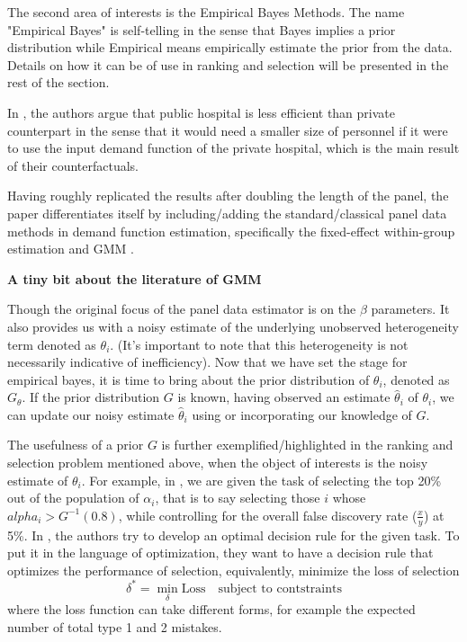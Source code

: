 \documentclass[12pt]{article}
\begin{document}
The second area of interests is the Empirical Bayes Methods. The name
"Empirical Bayes" is self-telling in the sense that Bayes implies a prior
distribution while Empirical means empirically estimate the prior from the
data. Details on how it can be of use in ranking and selection will be
presented in the rest of the section.

In \cite{croiset2024hospitals}, the authors argue that public hospital is less
efficient than private counterpart in the sense that it would need a smaller
size of personnel if it were to use the input demand function of the private
hospital, which is the main result of their counterfactuals.

Having roughly replicated the results after doubling the length of the panel,
the paper differentiates itself by including/adding the standard/classical
panel data methods in demand function estimation, specifically the fixed-effect
within-group estimation and GMM
\cite{arellano1991some,arellano1995another,blundell1998initial}.

\textbf{A tiny bit about the literature of GMM}

Though the original focus of the panel data estimator is on the $\beta$
parameters. It also provides us with a noisy estimate of the underlying
unobserved heterogeneity term denoted as $\theta_i$. (It's important to note
that this heterogeneity is not necessarily indicative of inefficiency). Now
that we have set the stage for empirical bayes, it is time to bring about the
prior distribution of $\theta_i$, denoted as $G_{\theta}$. If the prior
distribution $G$ is known, having observed an estimate $\hat{\theta}_i$ of
$\theta_i$, we can update our noisy estimate $\hat{\theta}_i$ using or
incorporating our knowledge of $G$.

The usefulness of a prior $G$ is further exemplified/highlighted in the ranking
and selection problem mentioned above, when the object of interests is the
noisy estimate of $\theta_i$. For example, in \cite{gu2023invidious}, we are
given the task of selecting the top 20\% out of the population of $\alpha_i$,
that is to say selecting those $i$ whose $alpha_i>G^{-1}(0.8)$, while
controlling for the overall false discovery rate ($\frac{x}{y}$) at 5\%. In
\cite{gu2023invidious}, the authors try to develop an optimal decision rule for
the given task. To put it in the language of optimization, they want to have a
decision rule that optimizes the performance of selection, equivalently,
minimize the loss of selection
\begin{equation*}
    \delta^* = \min_{\delta} \text{Loss} \quad \text{subject to contstraints}
\end{equation*}
where the loss function can take different forms, for example the
expected number of total type 1 and 2 mistakes.
\end{document}
